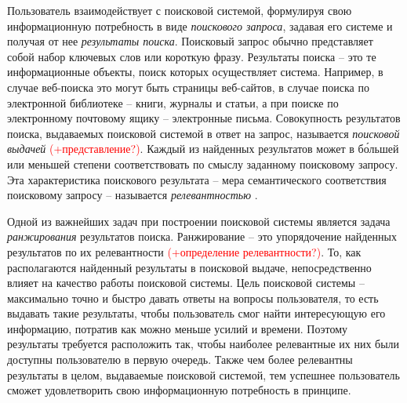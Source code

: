 \documentclass[12pt,a4paper]{report}
\newcommand\note[1]{\textcolor{red}{(#1)}}
\begin{document}
Пользователь взаимодействует с поисковой системой, формулируя свою информационную потребность в виде \emph{поискового запроса}, задавая его системе и получая от нее \emph{результаты поиска}. Поисковый запрос обычно представляет собой набор ключевых слов или короткую фразу.
Результаты поиска -- это те информационные объекты, поиск которых осуществляет система. Например, в случае веб-поиска это могут быть страницы веб-сайтов, в случае поиска по электронной библиотеке -- книги, журналы и статьи, а при поиске по электронному почтовому ящику -- электронные письма. Совокупность результатов поиска, выдаваемых поисковой системой в ответ на запрос, называется \emph{поисковой выдачей} \note{+представление?}. Каждый из найденных результатов может в б\'{о}льшей или меньшей степени соответствовать по смыслу заданному поисковому запросу. Эта характеристика поискового результата -- мера семантического соответствия поисковому запросу -- называется \emph{релевантностью} \cite{Mihalevich-CyberThesaurus, Ashmanov}.


Одной из важнейших задач при построении поисковой системы является задача \emph{ранжирования} результатов поиска. Ранжирование -- это упорядочение найденных результатов по их релевантности \cite{Ashmanov, LiuLR} \note{+определение релевантности?}. 
То, как располагаются найденный результаты в поисковой выдаче, непосредственно влияет на качество работы поисковой системы. Цель поисковой системы -- максимально точно и быстро давать ответы на вопросы пользователя, то есть выдавать такие результаты, чтобы пользователь смог найти интересующую его информацию, потратив как можно меньше усилий и времени. Поэтому результаты требуется расположить так, чтобы наиболее релевантные их них были доступны пользователю в первую очередь. Также чем более релевантны результаты в целом, выдаваемые поисковой системой, тем успешнее пользователь сможет удовлетворить свою информационную потребность в принципе.
\end{document}

